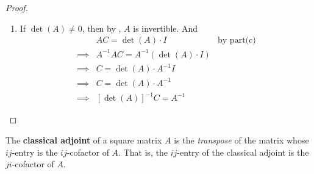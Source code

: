 \begin{proof}
\begin{enumerate}
\item If \(\det(A) \ne 0\), then by , \(A\) is invertible.
And
\begin{align*}
             & AC = \det(A) \cdot I & \text{by part(c)} \\
    \implies & A^{-1} AC = A^{-1} (\det(A) \cdot I) \\
    \implies & C = \det(A) \cdot A^{-1} I \\
    \implies & C = \det(A) \cdot A^{-1} \\
    \implies & [\det(A)]^{-1} C = A^{-1}
\end{align*}
\end{enumerate}
\end{proof}

\begin{additional definition} \label{adef 4.4}
The \textbf{classical adjoint} of a square matrix \(A\) is the \emph{transpose} of the matrix whose \(ij\)-entry is the \(ij\)-cofactor of \(A\).
That is, the \(ij\)-entry of the classical adjoint is the \(ji\)-cofactor of \(A\).
\end{additional definition}

